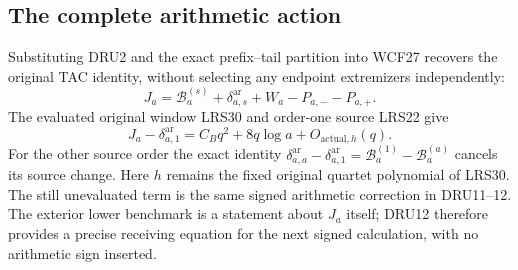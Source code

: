 \documentclass[11pt,a4paper]{article}
\begin{document}
\subsection{The complete arithmetic action}
Substituting DRU2 and the exact prefix--tail partition into WCF27
recovers the original TAC identity, without selecting any endpoint
extremizers independently:
\[
 J_a=\mathcal B_a^{(s)}+\delta_{a,s}^{\mathrm{ar}}
                          +W_a-P_{a,-}-P_{a,+}.
 \tag{DRU11}
\]
The evaluated original window LRS30 and order-one source LRS22 give
\[
 J_a-\delta_{a,1}^{\mathrm{ar}}
       =C_Bq^2+8q\log a+O_{\mathrm{actual},h}(q).
 \tag{DRU12}
\]
For the other source order the exact identity
$\delta_{a,a}^{\mathrm{ar}}-\delta_{a,1}^{\mathrm{ar}}
=\mathcal B_a^{(1)}-\mathcal B_a^{(a)}$ cancels its source change.
Here $h$ remains the fixed original quartet polynomial of LRS30.
The still unevaluated term is the same signed arithmetic correction
in DRU11--12.  The exterior lower benchmark is a statement about
$J_a$ itself; DRU12 therefore provides a precise receiving equation
for the next signed calculation, with no arithmetic sign inserted.
\endgroup

\end{document}
